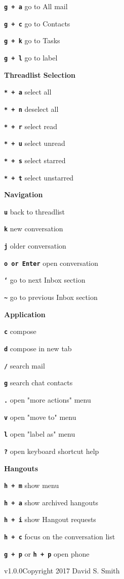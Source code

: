 \documentclass[11pt,letterpaper]{article}
\newcommand{\sck}[1]{\textbf{\texttt{#1}}}
\newcommand{\hdr}[1]{\vspace{1em}\textbf{\textsf \large #1}\vspace{0.5em}}
\begin{document}
\sck{g + a} \dotfill go to All mail	

\sck{g + c} \dotfill go to Contacts	

\sck{g + k} \dotfill go to Tasks	

\sck{g + l} \dotfill go to label	

\hdr{Threadlist Selection}

\sck{* + a} \dotfill select all	

\sck{* + n} \dotfill deselect all	

\sck{* + r} \dotfill select read	

\sck{* + u} \dotfill select unread	

\sck{* + s} \dotfill select starred	

\sck{* + t} \dotfill select unstarred	

\hdr{Navigation}

\sck{u} \dotfill back to threadlist	

\sck{k} \dotfill new conversation	

\sck{j} \dotfill older conversation	

\sck{o or Enter} \dotfill open conversation	

\sck{`} \dotfill go to next Inbox section	

\sck{\textasciitilde} \dotfill go to previous Inbox section	

\hdr{Application}

\sck{c} \dotfill compose	

\sck{d} \dotfill compose in new tab	

\sck{/} \dotfill search mail	

\sck{g} \dotfill search chat contacts	

\sck{.} \dotfill open "more actions" menu	

\sck{v} \dotfill open "move to" menu	

\sck{l} \dotfill open "label as" menu	

\sck{?} \dotfill open keyboard shortcut help	

\hdr{Hangouts}

\sck{h + m} \dotfill  show menu	

\sck{h + a} \dotfill  show archived hangouts	

\sck{h + i} \dotfill  show Hangout requests	

\sck{h + c} \dotfill focus on the conversation list	

\sck{g + p} or \sck{h + p} \dotfill open phone	

\vfill

{v1.0.0\break Copyright 2017 David S. Smith}
\end{document}
